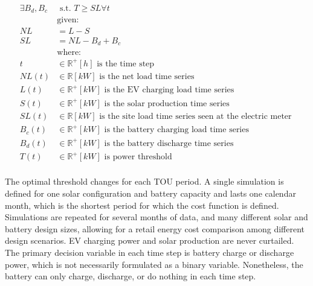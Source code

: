 \documentclass[journal,article,submit,pdftex,moreauthors]{Definitions/mdpi}
\begin{document}
\begin{equation}
  \label{eq:net-load}
  \begin{split}
    \exists B_d, B_c &\text{ s.t. } T \ge SL \forall t                                    \\      
            & \text{given:}                                                                        \\
    NL     & = L - S                                                                              \\
    SL     & = NL - B_d + B_c                                                                     \\
            & \text{where:}                                                                        \\
    t      & \in \mathbb{R}^+ [h] \text{ is the time step }      \\             
    NL(t)  & \in \mathbb{R} [kW] \text{ is the net load time series }                             \\
    L(t)   & \in \mathbb{R}^+ [kW] \text{ is the EV charging load time series }                   \\
    S(t)   & \in \mathbb{R}^+ [kW] \text{ is the solar production time series }                   \\
    SL(t)  & \in \mathbb{R} [kW] \text{ is the site load time series seen at the electric meter } \\
    B_c(t) & \in \mathbb{R}^+ [kW] \text{ is the battery charging load time series }              \\
    B_d(t) & \in \mathbb{R}^+ [kW] \text{ is the battery discharge time series }                  \\
    T(t)   & \in \mathbb{R}^+ [kW] \text{ is power threshold }                                    \\
  \end{split}
\end{equation}

The optimal threshold changes for each TOU period. A single simulation is defined for one solar configuration and battery capacity and lasts one calendar month, which is the shortest period for which the cost function is defined. Simulations are repeated for several months of data, and many different solar and battery design sizes, allowing for a retail energy cost comparison among different design scenarios. EV charging power and solar production are never curtailed. The primary decision variable in each time step is battery charge or discharge power, which is not necessarily formulated as a binary variable. Nonetheless, the battery can only charge, discharge, or do nothing in each time step.
\end{document}
